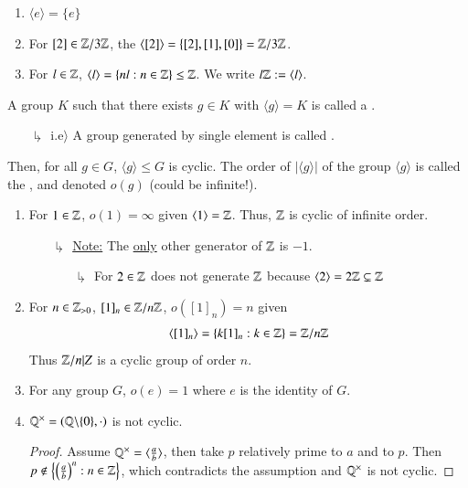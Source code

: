 \documentclass[12pt, a4paper, oneside, openright, titlepage]{book}
\begin{document}
\begin{eg}
    \leavevmode
    \begin{enumerate}
        \item $\langle e \rangle = \{e\}$
        \item For $[2] \in \mathbb Z/3\mathbb Z$, the $\langle [2] \rangle = \{[2], [1], [0]\} = \mathbb Z/3\mathbb Z$.
        \item For $l \in \mathbb Z$, $\langle l \rangle = \{nl:n\in\mathbb Z\}\leq \mathbb Z$. We write $l\mathbb Z := \langle l \rangle$.
    \end{enumerate}
\end{eg}

\begin{defn}
    A group $K$ such that there exists $g \in K$ with $\langle g \rangle = K$ is called a .
\end{defn}
\begin{enumerate}
    \item[$\drsh$] i.e$\rangle$ A group generated by single element is called .
\end{enumerate}


\begin{defn}
    Then, for all $g \in G$, $\langle g \rangle \leq G$ is cyclic. The order of $|\langle g \rangle|$ of the group $\langle g \rangle$ is called the , and denoted $o(g)$ (could be infinite!).
\end{defn}


\begin{eg}
    \leavevmode
    \begin{enumerate}
        \item For $1 \in \mathbb Z$, $o(1) = \infty$ given $\langle 1 \rangle = \mathbb Z$. Thus, $\mathbb Z$ is cyclic of infinite order.
        \begin{enumerate}
            \item[$\drsh$] \underline{Note:} The \underline{only} other generator of $\mathbb Z$ is $-1$.
            \begin{enumerate}
                \item[$\drsh$] For $2 \in \mathbb Z$ does not generate $\mathbb Z$ because $\langle 2 \rangle = 2\mathbb Z \subsetneq \mathbb Z$ 
            \end{enumerate}
        \end{enumerate}
        \item For $n \in \mathbb Z_{>0}$, $[1]_n \in \mathbb Z/n\mathbb Z$, $o([1]_n) = n$ given $$\langle [1]_n\rangle = \{k[1]_n:k \in \mathbb Z\} = \mathbb Z/n\mathbb Z$$
        Thus $\mathbb Z/n|Z$ is a cyclic group of order $n$.
        \item For any group $G$, $o(e) = 1$ where $e$ is the identity of $G$.
        \item $\mathbb Q^{\times} = (\mathbb Q\backslash\{0\},\cdot)$ is not cyclic.
        \begin{proof}
            Assume $\mathbb Q^{\times} = \langle \frac{a}{b}\rangle$, then take $p$ relatively prime to $a$ and to $p$. Then $p \notin \left\{\left(\frac{a}{b}\right)^n: n \in \mathbb Z\right\}$, which contradicts the assumption and $\mathbb Q^{\times}$ is not cyclic.
        \end{proof}
    \end{enumerate}
\end{eg}
\end{document}
